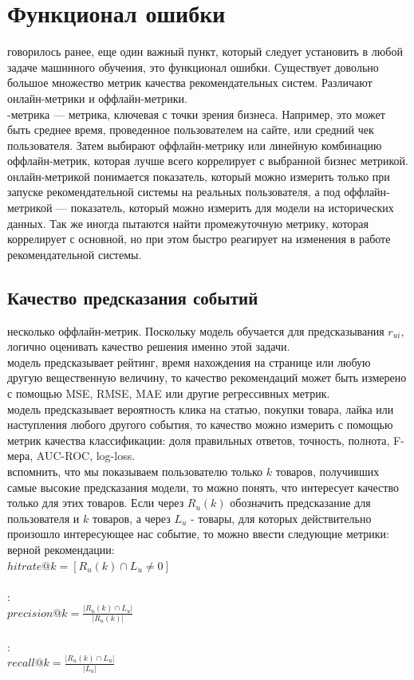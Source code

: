 \documentclass{article}
\newcommand\tab[1][1cm]{\hspace*{#1}}
\begin{document}
\section{Функционал ошибки}
 говорилось ранее, еще один важный пункт, который следует установить в любой задаче машинного обучения, это функционал ошибки. Существует довольно большое множество метрик качества рекомендательных систем. Различают онлайн-метрики и оффлайн-метрики.\\
-метрика — метрика, ключевая с точки зрения бизнеса. Например, это может быть среднее время, проведенное пользователем на сайте, или средний чек пользователя. Затем выбирают оффлайн-метрику или линейную комбинацию оффлайн-метрик, которая лучше всего коррелирует с выбранной бизнес метрикой.\\ 
 онлайн-метрикой понимается показатель, который можно измерить только при запуске рекомендательной системы на реальных пользователя, а под оффлайн-метрикой — показатель, который можно измерить для модели на исторических данных. Так же иногда пытаются найти промежуточную метрику, которая коррелирует с основной, но при этом быстро реагирует на изменения в работе рекомендательной системы.\\
\subsection{Качество предсказания событий}
 несколько оффлайн-метрик. Поскольку модель обучается для предсказывания $r_{ui}$, логично оценивать качество решения именно этой задачи.\\
 модель предсказывает рейтинг, время нахождения на странице или любую другую вещественную величину, то качество рекомендаций может быть измерено с помощью ﻿MSE﻿, ﻿RMSE, ﻿MAE﻿ или другие регрессивных метрик.\\
 модель предсказывает вероятность клика на статью, покупки товара, лайка или наступления любого другого события, то качество можно измерить с помощью метрик качества классификации: доля правильных ответов, точность, полнота, F-мера, AUC-ROC, log-loss.\\
 вспомнить, что мы показываем пользователю только ﻿$k$﻿ товаров, получивших самые высокие предсказания модели, то можно понять, что интересует качество только для этих товаров. Если через ﻿$R_u(k)$ обозначить предсказание для пользователя и ﻿$k$ товаров, а через $L_u$ - товары, для которых действительно произошло интересующее нас событие, то можно ввести следующие метрики:\\
 верной рекомендации:\\
\tab\tab$hitrate@k=[R_u(k)\cap L_u \neq 0]$\\
\\
:\\
\tab\tab$precision@k=\frac{|R_u(k)\cap L_u|}{|R_u(k)|}$\\
\\
:\\
\tab\tab$recall@k=\frac{|R_{u}(k)\cap L_{u}|}{|L_{u}|}$\\
\end{document}

